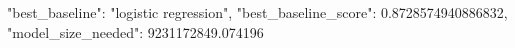 {
  "best_baseline": "logistic regression",
  "best_baseline_score": 0.8728574940886832,
  "model_size_needed": 9231172849.074196
}